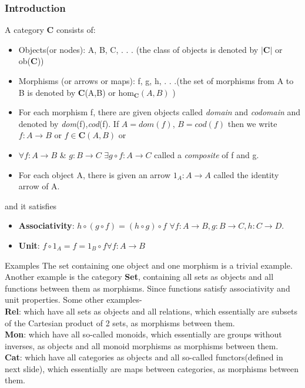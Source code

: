 \documentclass[11pt]{beamer}
\begin{document}
\begin{frame}
\frametitle{Introduction}
\begin{definition}
\fontsize{10}{12}\selectfont
A category \textbf{C} consists of:
\begin{itemize}
    \item Objects(or nodes): A, B, C, . . . (the class of objects is denoted by \(|{\textbf{C}}|\) or ob(\textbf{C}))
    \item Morphisms (or arrows or maps): f, g, h, . . .(the set of morphisms from A to B is denoted by \textbf{C}(A,B) or hom$_{\textbf{C}}(A,B)$ )
    \item For each morphism f, there are given objects called \textit{domain} and \textit{codomain} and denoted by \textit{dom}(f),\textit{cod}(f). If $A=\textit{dom}(f)$, $B=\textit{cod}(f)$ then we write $f:A\rightarrow B$ or $f \in \textbf{C}(A,B)$ or 
    \item $\forall f:A\rightarrow B$ \& $g:B\rightarrow C$ $\exists g \circ f:A\rightarrow C$ called a \textit{composite}  of f and g.
    \item For each object A, there is given an arrow $1_A : A \rightarrow A$ called the identity arrow of A.
\end{itemize}
and it satisfies 
\begin{itemize}
    \item \textbf{Associativity}: $h \circ (g \circ f) = (h \circ g) \circ f$  $\forall 
f:A\rightarrow B, g:B\rightarrow C,h:C\rightarrow D$.
    \item \textbf{Unit}: $f \circ 1_A = f = 1_B \circ f \forall f : A \rightarrow B$
\end{itemize}

\end{definition}
\end{frame}
\begin{frame}{Examples}
The set containing one object and one morphism is a trivial example. Another example is the category \textbf{Set}, containing all sets as objects and all functions between them as morphisms. Since functions satisfy associativity and unit properties. Some other examples-\\
\textbf{Rel}: which have all sets as objects and all relations, which essentially are subsets of the Cartesian product of 2 sets, as morphisms between them.\\
\textbf{Mon}: which have all so-called monoids, which essentially are groups without inverses, as
objects and all monoid morphisms as morphisms between them.\\
\textbf{Cat}: which have all categories as objects and all so-called functors(defined in next slide), which essentially are maps between categories, as morphisms between them.
\end{frame}
\end{document}
